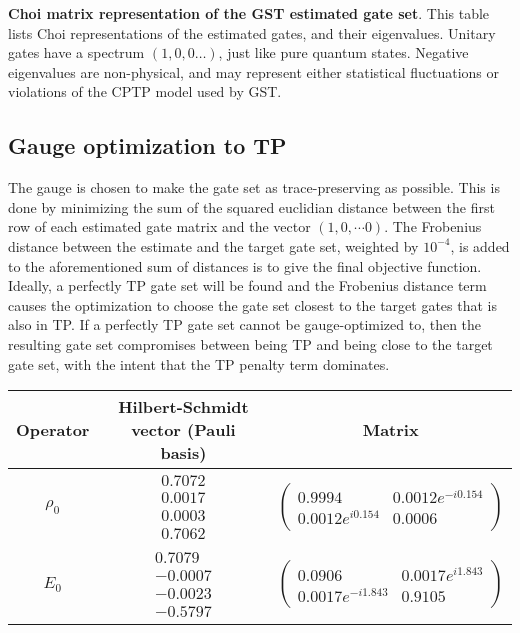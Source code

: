 {\begin{table}[h]
\begin{center}
\caption{\textbf{Choi matrix representation of the GST estimated gate set}.  This table lists Choi representations of the estimated gates, and their eigenvalues.  Unitary gates have a spectrum $(1,0,0\ldots)$, just like pure quantum states.  Negative eigenvalues are non-physical, and may represent either statistical fluctuations or violations of the CPTP model used by GST.\label{bestTargetGatesGatesetChoiTable}}
\end{center}
\end{table}

\clearpage

\subsection{Gauge optimization to TP}
The gauge is chosen to make the gate set as trace-preserving as possible.  This is done by minimizing the sum of the squared euclidian distance between the first row of each estimated gate matrix and the vector $(1,0,\cdots 0)$.  The Frobenius distance between the estimate and the target gate set, weighted by $10^{-4}$, is added to the aforementioned sum of distances is to give the final objective function.  Ideally, a perfectly TP gate set will be found and the Frobenius distance term causes the optimization to choose the gate set closest to the target gates that is also in TP.  If a perfectly TP gate set cannot be gauge-optimized to, then the resulting gate set compromises between being TP and being close to the target gate set, with the intent that the TP penalty term dominates.

\begin{table}[h]
\begin{center}
\begin{tabular}[l]{|c|c|c|}
\hline
Operator & Hilbert-Schmidt vector (Pauli basis) & Matrix \\ \hline
$\rho_{0}$ & $ \begin{array}{c}
0.7072 \\ 
0.0017 \\ 
0.0003 \\ 
0.7062
 \end{array} $
 & $ \left(\!\!\begin{array}{cc}
0.9994 & 0.0012e^{-i0.154} \\ 
0.0012e^{i0.154} & 0.0006
 \end{array}\!\!\right) $
 \\ \hline
$E_{0}$ & $ \begin{array}{c}
0.7079 \\ 
-0.0007 \\ 
-0.0023 \\ 
-0.5797
 \end{array} $
 & $ \left(\!\!\begin{array}{cc}
0.0906 & 0.0017e^{i1.843} \\ 
0.0017e^{-i1.843} & 0.9105
 \end{array}\!\!\right) $
 \\ \hline
\end{tabular}


\end{center}
\end{table}}

